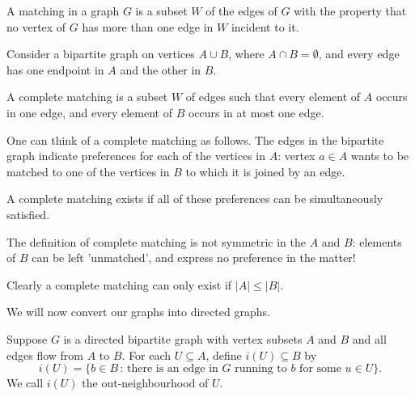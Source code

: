 \documentclass[10pt, a4paper]{article}
\begin{document}
\begin{definition}
    A matching in a graph $G$ is a subset $W$ of the edges of $G$ with the property that no vertex of $G$ has more than one edge in $W$ incident to it.
\end{definition}

Consider a bipartite graph on vertices $A \cup B$,
where $A \cap B = \emptyset$,
and every edge has one endpoint in $A$ and the other in $B$.

\begin{definition}
    A complete matching is a subset $W$ of edges such that every element of $A$ occurs in one edge,
    and every element of $B$ occurs in at most one edge.
\end{definition}

One can think of a complete matching as follows.
The edges in the bipartite graph indicate preferences for each of the vertices in $A$:
vertex $a \in A$ wants to be matched to one of the vertices in $B$ to which it is joined by an edge.

A complete matching exists if all of these preferences can be simultaneously satisfied.

The definition of complete matching is not symmetric in the $A$ and $B$:
elements of $B$ can be left 'unmatched',
and express no preference in the matter!

\begin{remark}
    Clearly a complete matching can only exist if $|A| \leq |B|$.
\end{remark}

We will now convert our graphs into directed graphs.

\begin{definition}
    Suppose $G$ is a directed bipartite graph with vertex subsets $A$ and $B$ and all edges flow from $A$ to $B$.
    For each $U \subseteq A$,
    define $i(U) \subseteq B$ by
    \[
    i(U) = \{b \in B\,:\,\text{there is an edge in $G$ running to $b$ for some $u \in U$}\}.
    \]
    We call $i(U)$ the out-neighbourhood of $U$.
\end{definition}
\end{document}
